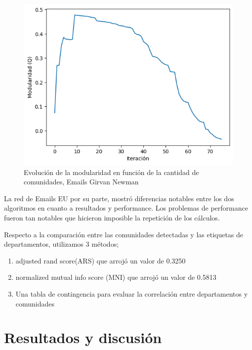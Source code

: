 \documentclass[conference]{IEEEtran}
\begin{document}
\begin{figure}[!h]
    \centering
    \includegraphics[width=\linewidth]{img/comu_GNlesmisModularity.png} %
    \caption{Evolución de la modularidad en función de la cantidad de comunidades, Emails Girvan Newman}
    \label{fig:curva-modularidad}
\end{figure}

La red de Emails EU por su parte, mostró diferencias notables entre los dos algoritmos en cuanto a resultados y performance. Los problemas de performance fueron tan notables que hicieron imposible la repetición de los cálculos.

Respecto a la comparación entre las comunidades detectadas y las etiquetas de departamentos, utilizamos 3 métodos;
\begin{enumerate}
    \item adjusted rand score(ARS) que arrojó un valor de 0.3250
    \item normalized mutual info score (MNI) que arrojó un valor de 0.5813
    \item Una tabla de contingencia para evaluar la correlación entre departamentos y comunidades 
\end{enumerate}

\vspace{15pt}

\section{\textbf{Resultados y discusión}}

\vspace{10pt}
\end{document}
